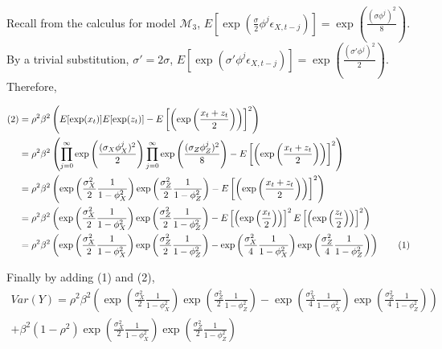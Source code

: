 \documentclass[11pt,a4,twosided,singlespacing,titlepagenumber=on]{scrreprt}
\numberwithin{equation}{chapter} %
\theoremstyle{remark}
\newcommand\numberthis{\addtocounter{equation}{1}\tag{\theequation}}
\begin{document}
Recall from the calculus for model $\mathcal{M}_3$, $E\left[\exp \left( \frac{\sigma}{2} \phi^j \epsilon_{X, t-j} \right) \right] = \exp \left(\frac{(\sigma\phi^j)^2}{8} \right)$. By a trivial substitution, $\sigma' = 2 \sigma$, $E\left[\exp \left( \sigma' \phi^j \epsilon_{X, t-j} \right) \right] = \exp \left(\frac{(\sigma'\phi^j)^2}{2} \right)$. Therefore,

\begin{align*}
(2) &= \rho^2 \beta^2 \left( E [ \exp (x_t) ] E [ \exp (z_t) ] - E \left[ \left( \exp \left(\frac{x_t + z_t}{2}\right) \right) \right]^2\right) \\
                                                  &= \rho^2 \beta^2 \left( \prod_{j=0}^\infty \exp \left(\frac{(\sigma_X\phi_X^j)^2}{2} \right) \prod_{j=0}^\infty \exp \left(\frac{(\sigma_Z\phi_Z^j)^2}{8} \right) - E \left[ \left( \exp \left(\frac{x_t + z_t}{2}\right) \right) \right]^2\right) \\
                                                  &= \rho^2 \beta^2 \left( \exp \left( \frac{\sigma_X^2}{2} \frac{1}{1-\phi_X^{2}} \right) \exp \left( \frac{\sigma_Z^2}{2} \frac{1}{1-\phi_Z^{2}} \right) - E \left[ \left( \exp \left(\frac{x_t + z_t}{2}\right) \right) \right]^2\right) \\
                                                  &= \rho^2 \beta^2 \left( \exp \left( \frac{\sigma_X^2}{2} \frac{1}{1-\phi_X^{2}} \right) \exp \left( \frac{\sigma_Z^2}{2} \frac{1}{1-\phi_Z^{2}} \right) - E \left[ \left( \exp \left(\frac{x_t}{2}\right) \right)\right]^2 E \left[ \left( \exp \left(\frac{z_t}{2}\right) \right)\right]^2\right) \\
                                                  &= \rho^2 \beta^2 \left( \exp \left( \frac{\sigma_X^2}{2} \frac{1}{1-\phi_X^{2}} \right) \exp \left( \frac{\sigma_Z^2}{2} \frac{1}{1-\phi_Z^{2}} \right) - \exp \left( \frac{\sigma_X^2}{4} \frac{1}{1-\phi_X^{2}} \right) \exp \left( \frac{\sigma_Z^2}{4} \frac{1}{1-\phi_Z^{2}}\right) \right) \numberthis
\end{align*}

Finally by adding (1) and (2),
\begin{multline}
Var(Y) = \rho^2 \beta^2 \left( \exp \left( \frac{\sigma_X^2}{2} \frac{1}{1-\phi_X^{2}} \right) \exp \left( \frac{\sigma_Z^2}{2} \frac{1}{1-\phi_Z^{2}} \right) - \exp \left( \frac{\sigma_X^2}{4} \frac{1}{1-\phi_X^{2}} \right) \exp \left( \frac{\sigma_Z^2}{4} \frac{1}{1-\phi_Z^{2}}\right) \right) \\ + \beta^2 (1-\rho^2) \exp \left( \frac{\sigma_X^2}{2} \frac{1}{1-\phi_X^{2}}\right) \exp \left( \frac{\sigma_Z^2}{2} \frac{1}{1-\phi_Z^{2}}\right)
\end{multline}
\end{document}
